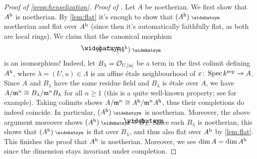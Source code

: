 \begin{proof}[Proof of \cref{prop:henselization}]
	\emph{Proof of .} Let $A$ be noetherian. We first show that $A^{\mathrm{h}}$ is noetherian. By \cref{lem:flat} it's enough to show that $(A^\h)^\complete$ noetherian and flat over $A^{\mathrm{h}}$ (since then it's automatically faithfully flat, as both are local rings). We claim that the canonical morphism
	\begin{equation}\label{eq:AhComplete}
		\roof{A}\isomorphism(A^\h)^\complete
	\end{equation}
	is an isomorphism! Indeed, let $B_\lambda=\mathcal{O}_{U,|u|}$ be a term in the first colimit defining $A^{\mathrm{h}}$, where $\lambda=(U,u)\in\Lambda$ is an affine étale neighbourhood of $x\colon \Spec k^\sep\morphism A$. Since $A$ and $B_\lambda$ have the same residue field and $B_\lambda$ is étale over $A$, we have $A/\mathfrak{m}^n\cong B_\lambda/\mathfrak{m}^nB_\lambda$ for all $n\geq 1$ (this is a quite well-known property; see \cite[Lemma~A.4.2]{jacobians} for example). Taking colimits shows $A/\mathfrak{m}^n\cong A^{\mathrm{h}}/\mathfrak{m}^nA^{\mathrm{h}}$, thus their completions do indeed coincide. In particular, $(A^\h)^\complete$ is noetherian. Moreover, the above argument moreover shows $(A^\h)^\complete\cong \roof{B}_\lambda$. Since each $B_\lambda$ is noetherian, this shows that $(A^\h)^\complete$ is flat over $B_\lambda$, and thus also flat over $A^{\mathrm{h}}$ by \cref{lem:flat}. This finishes the proof that $A^{\mathrm{h}}$ is noetherian. Moreover, we see $\dim A=\dim A^{\mathrm{h}}$ since the dimension stays invariant under completion.
	

\end{proof}

